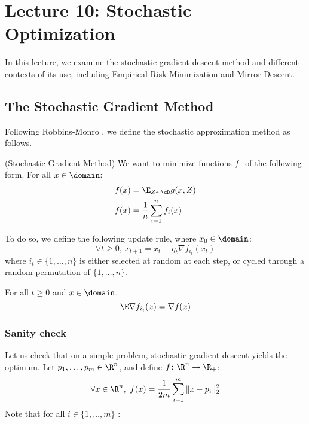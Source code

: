 \section{Lecture 10: Stochastic Optimization}
In this lecture, we examine the stochastic gradient descent method and different contexts of its use, including Empirical Risk Minimization and Mirror Descent. 
\subsection{The Stochastic Gradient Method}

Following Robbins-Monro \cite{Robbins&Monro:1951}, we define the stochastic approximation method as follows. 

\begin{definition}(Stochastic Gradient Method)
We want to minimize functions $f\colon$ of the following form. For all $x \in \domain$:
\begin{align*}
    f(x) &= \E_{Z\sim \cD}g(x,Z) \\
    f(x) &= \frac{1}{n}\sum_{i=1}^n f_i(x)
\end{align*}

To do so, we define the following update rule, where $x_0\in\domain$:
\begin{equation*}
    \forall t\geq0,\ x_{t+1} = x_t - \eta_t\nabla f_{i_t}(x_t) 
\end{equation*}
where $i_t\in\{1,\dots,n\}$ is either selected at random at each step, or cycled through a random permutation of $\{1,\dots,n\}$.
\end{definition}

\begin{fact}
For all $t\geq0$ and $x\in\domain$,
\begin{equation}
    \E\nabla f_{i_t}(x) = \nabla f(x)
\end{equation}
\end{fact}

\subsubsection{Sanity check}

Let us check that on a simple problem, stochastic gradient descent yields the optimum. Let $p_1, \dots, p_m\in \R^n$, and define $f\colon \R^n \rightarrow \R_+$:
\begin{equation*}
    \forall x\in \R^n,\ f(x) = \frac{1}{2m}\sum_{i=1}^m \|x-p_i\|_2^2
\end{equation*}
Note that for all $i\in\{1,\dots, m\}$ :


